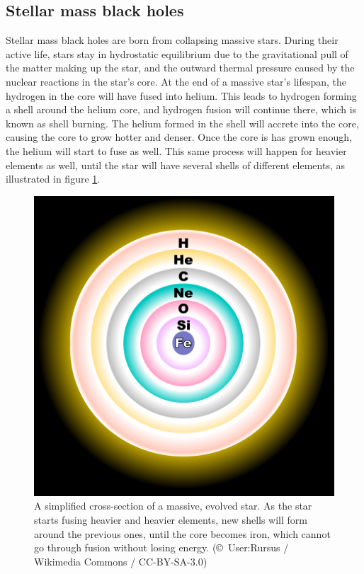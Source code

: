 \documentclass[english, oneside]{HYgradu}
\begin{document}

\subsection{Stellar mass black holes} \label{sect:stellarholes}

Stellar mass black holes are born from collapsing massive stars. During their active life, stars stay in hydrostatic equilibrium due to the gravitational pull of the matter making up the star, and the outward thermal pressure caused by the nuclear reactions in the star's core. At the end of a massive star's lifespan, the hydrogen in the core will have fused into helium. This leads to hydrogen forming a shell around the helium core, and hydrogen fusion will continue there, which is known as shell burning. The helium formed in the shell will accrete into the core, causing the core to grow hotter and denser. Once the core is has grown enough, the helium will start to fuse as well. This same process will happen for heavier elements as well, until the star will have several shells of different elements, as illustrated in figure \ref{fig:FusionShells}.

\begin{figure}[h!tb]
\centering
\includegraphics[width=\textwidth]{../images/FusionShells.pdf}
\caption{A simplified cross-section of a massive, evolved star. As the star starts fusing heavier and heavier elements, new shells will form around the previous ones, until the core becomes iron, which cannot go through fusion without losing energy.
(\copyright \ User:Rursus / Wikimedia Commons / CC-BY-SA-3.0)}
\label{fig:FusionShells}
\end{figure}
\end{document}
